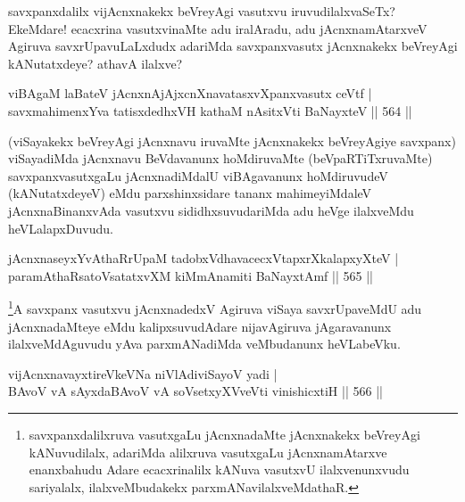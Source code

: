 \begin{artha}
savxpanxdalilx vijAcnxnakekx beVreyAgi vasutxvu iruvudilalxvaSeTx? EkeMdare! ecacxrina vasutxvinaMte adu iralAradu, adu jAcnxnamAtarxveV Agiruva savxrUpavuLaLxdudx adariMda savxpanxvasutx jAcnxnakekx beVreyAgi kANutatxdeye? athavA ilalxve?
\end{artha}


\begin{shl}
viBAgaM laBateV jAcnxnAjAjxcnXnavatasxvXpanxvasutx ceVtf | \\
savxmahimenxYva tatisxdedhxVH kathaM nAsitxVti BaNayxteV \hfill||  564 ||  
\end{shl}

\begin{artha}
(viSayakekx beVreyAgi jAcnxnavu iruvaMte jAcnxnakekx beVreyAgiye savxpanx) viSayadiMda jAcnxnavu BeVdavanunx hoMdiruvaMte (beVpaRTiTxruvaMte) savxpanxvasutxgaLu jAcnxnadiMdalU viBAgavanunx hoMdiruvudeV (kANutatxdeyeV) eMdu parxshinxsidare tananx mahimeyiMdaleV jAcnxnaBinanxvAda vasutxvu sididhxsuvudariMda adu heVge ilalxveMdu heVLalapxDuvudu.
\end{artha}


\begin{shl}
jAcnxnaseyxYvAthaRrUpaM tadobxVdhavacecxVtapxrXkalapxyXteV | \\
paramAthaRsatoV\s satatxvXM kiMmAnamiti BaNayxtAmf \hfill||  565 ||  
\end{shl}

\begin{artha}
\footnote[1]{savxpanxdalilxruva vasutxgaLu jAcnxnadaMte jAcnxnakekx beVreyAgi kANuvudilalx, adariMda alilxruva vasutxgaLu jAcnxnamAtarxve enanxbahudu Adare ecacxrinalilx kANuva vasutxvU ilalxvenunxvudu sariyalalx, ilalxveMbudakekx parxmANavilalxveMdathaR.}A savxpanx vasutxvu jAcnxnadedxV Agiruva viSaya savxrUpaveMdU adu jAcnxnadaMteye eMdu kalipxsuvudAdare nijavAgiruva jAgaravanunx ilalxveMdAguvudu yAva parxmANadiMda veMbudanunx heVLabeVku.
\end{artha}


\begin{shl}
\footnotemark[2]vijAcnxnavayxtireVkeVNa niVlAdiviSayoV yadi | \\
BAvoV vA sAyxdaBAvoV vA soV\s setxyXVveVti vinishicxtiH \hfill||  566 ||  
\end{shl}

